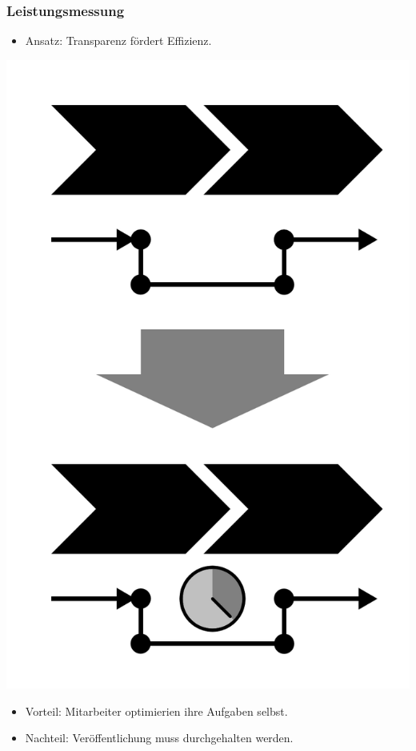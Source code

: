 \documentclass{beamer}
\begin{document}
 \begin{frame}
  \frametitle{Leistungsmessung}
   \begin{itemize}
    \item Ansatz: Transparenz fördert Effizienz.
   \end{itemize}
  \centerline{\includegraphics[scale=2.5]{4_6_10.png}}
  \begin{itemize}
    \item Vorteil: Mitarbeiter optimierien ihre Aufgaben selbst.
    \item Nachteil: Veröffentlichung muss durchgehalten werden.
  \end{itemize}
 \end{frame}
\end{document}
